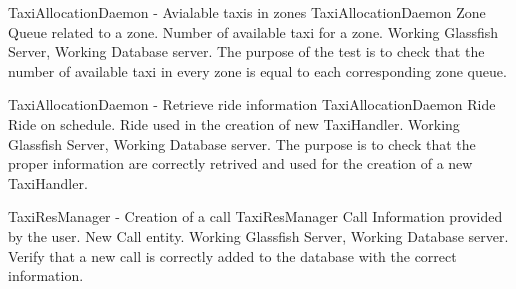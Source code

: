 \testx
{TaxiAllocationDaemon - Avialable taxis in zones}
{TaxiAllocationDaemon}
{Zone}
{Queue related to a zone.}
{Number of available taxi for a zone.}
{Working Glassfish Server, Working Database server.}
{The purpose of the test is to check that the number of available taxi in every
zone is equal to each corresponding zone queue.}

\testx
{TaxiAllocationDaemon - Retrieve ride information}
{TaxiAllocationDaemon}
{Ride}
{Ride on schedule.}
{Ride used in the creation of  new TaxiHandler.}
{Working Glassfish Server, Working Database server.}
{The purpose is to check that the proper information are correctly retrived and
used for the creation of a new TaxiHandler.}

\testx
{TaxiResManager - Creation of a call}
{TaxiResManager}
{Call}
{Information provided by the user.}
{New Call entity.}
{Working Glassfish Server, Working Database server.}
{Verify that a new call is correctly added to the database with the correct information.}
